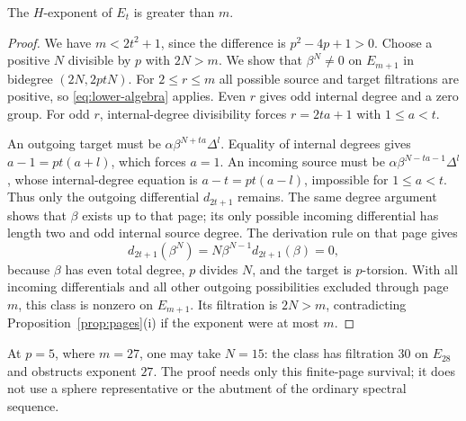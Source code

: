 \begin{proposition}\label{prop:lower-exponent}
The $H$-exponent of $E_t$ is greater than $m$.
\end{proposition}
\begin{proof}
We have $m<2t^2+1$, since the difference is $p^2-4p+1>0$.
Choose a positive $N$ divisible by $p$ with $2N>m$. We show that
$\beta^N\ne0$ on $E_{m+1}$ in bidegree $(2N,2ptN)$.
For $2\leq r\leq m$ all possible source and target filtrations are
positive, so \eqref{eq:lower-algebra} applies. Even $r$ gives odd
internal degree and a zero group. For odd $r$, internal-degree divisibility
forces $r=2ta+1$ with $1\leq a<t$.

An outgoing target must be $\alpha\beta^{N+ta}\Delta^l$.
Equality of internal degrees gives $a-1=pt(a+l)$, which forces $a=1$.
An incoming source must be $\alpha\beta^{N-ta-1}\Delta^l$,
whose internal-degree equation is $a-t=pt(a-l)$, impossible for
$1\leq a<t$. Thus only the outgoing differential $d_{2t+1}$ remains.
The same degree argument shows that $\beta$ exists up to that page;
its only possible incoming differential has length two and odd internal
source degree. The derivation rule on that page gives
\[
 d_{2t+1}(\beta^N)=N\beta^{N-1}d_{2t+1}(\beta)=0,
\]
because $\beta$ has even total degree, $p$ divides $N$, and the target is
$p$-torsion. With all incoming differentials and all other outgoing
possibilities excluded through page $m$, this class is nonzero on
$E_{m+1}$. Its filtration is $2N>m$, contradicting
Proposition~\ref{prop:pages}(i) if the exponent were at most $m$.
\end{proof}

At $p=5$, where $m=27$, one may take $N=15$: the class has filtration
$30$ on $E_{28}$ and obstructs exponent $27$. The proof needs only
this finite-page survival; it does not use a sphere representative or
the abutment of the ordinary spectral sequence.
